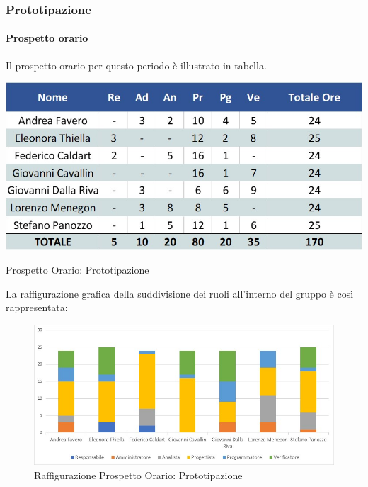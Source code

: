 \subsubsection{Prototipazione}
\paragraph{Prospetto orario}
Il prospetto orario per questo periodo è illustrato in tabella.
\begin{table}[H]
	\centerline{\includegraphics[scale=0.7]{img/Preventivo/PrototipazioneOrario.jpg}}
	\caption{Prospetto Orario: Prototipazione}
	\clearpage
\end{table}
La raffigurazione grafica della suddivisione dei ruoli all'interno del gruppo è così rappresentata: 
\begin{figure}[H]
	\centerline{\includegraphics[scale=0.85]{img/Preventivo/Istogrammi/Prototipazione.jpg}}
	\caption{Raffigurazione Prospetto Orario: Prototipazione}
	\clearpage
\end{figure}
\newpage
